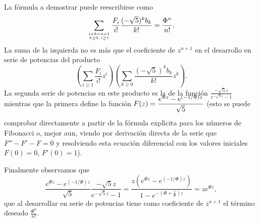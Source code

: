 \begin{demostracion}
La f\'ormula a demostrar puede reescribirse como
$$\sum_{i+k=n+1\atop k\geq 0,\, i\geq 1}\frac{F_i}{i!}\frac{(-\sqrt 5)^kb_k}{k!}=\frac{\Phi^n}{n!}.$$
La suma de la izquierda no es m\'as que el coeficiente de $z^{n+1}$ en el desarrollo en serie de potencias del producto
$$\left(\sum_{i\geq 1}\frac{F_i}{i!}z^i\right)\left(\sum_{k\geq 0}\frac{(-\sqrt 5)^kb_k}{k!} z^k\right).$$
La segunda serie de potencias en este producto es la de la funci\'on $\displaystyle\frac{-\sqrt 5 z}{e^{-\sqrt 5 z}-1}$ mientras que  la primera define la funci\'on $\rule[-16pt]{0pt}{26pt}\displaystyle \smash{F(z)=\frac{e^{\Phi z}-e^{(-1/\Phi)z}}{\sqrt 5}}$ (esto se puede comprobar directamente a partir de la f\'ormula expl\'\i cita para los n\'umeros de Fibonacci o, mejor aun, viendo por derivaci\'on directa de la serie que $F''-F'-F=0$ y resolviendo esta ecuaci\'on diferencial con los valores iniciales $F(0)=0$, $F'(0)=1$).

Finalmente observamos que
$$ \frac{e^{\Phi z}-e^{(-1/\Phi)z}}{\sqrt 5} \frac{-\sqrt 5 z}{e^{-\sqrt 5 z}-1} = 
\frac{z(e^{\Phi z}-e^{(-1/\Phi)z})}{1-e^{-(\Phi+\frac{1}{\Phi})z}}=ze^{\Phi z},$$
que al desarrollar en serie de potencias tiene como coeficiente de $z^{n+1}$ el t\'ermino deseado $\frac{\Phi^n}{n!}$.
\end{demostracion} 